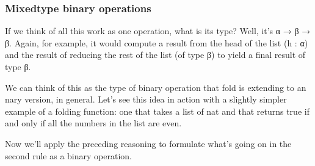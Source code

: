 \documentclass[letterpaper,10pt,english]{sphinxmanual}
\begin{document}
\subsubsection{Mixed\sphinxhyphen{}type binary operations}
\label{\detokenize{A_03_Recursive_Types:mixed-type-binary-operations}}
\sphinxAtStartPar
If we think of all this work as one operation, what is its
type? Well, it’s α → β → β. Again, for example, it would
compute a result from the head of the list (h : α) and the
result of reducing the rest of the list (of type β) to yield
a final result of type β.

\sphinxAtStartPar
We can think of this as the type of binary operation that
fold is extending to an n\sphinxhyphen{}ary version, in general. Let’s
see this idea in action with a slightly simpler example
of a folding function: one that takes a list of nat and
that returns true if and only if all the numbers in the
list are even.

\begin{sphinxVerbatim}[commandchars=\\\{\}]
      
   
          

  \PYG{o}{[}\PYG{o}{]}
  \PYG{o}{[}\PYG{o}{]}
\end{sphinxVerbatim}

\sphinxAtStartPar
Now we’ll apply the preceding reasoning to formulate
what’s going on in the second rule as a binary operation.
\end{document}
